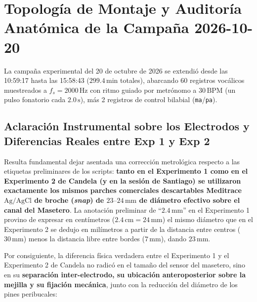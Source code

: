 \documentclass[11pt,a4paper]{article}
\begin{document}
\section{Topología de Montaje y Auditoría Anatómica de la Campaña 2026-10-20}

La campaña experimental del 20 de octubre de 2026 se extendió desde las 10:59:17 hasta las 15:58:43 ($299.4\,\text{min}$ totales), abarcando 60 registros vocálicos muestreados a $f_s = 2000\,\text{Hz}$ con ritmo guiado por metrónomo a $30\,\text{BPM}$ (un pulso fonatorio cada $2.0\,\text{s}$), más 2 registros de control bilabial (\texttt{ma}/\texttt{pa}).

\subsection{Aclaración Instrumental sobre los Electrodos y Diferencias Reales entre Exp 1 y Exp 2}
Resulta fundamental dejar asentada una corrección metrológica respecto a las etiquetas preliminares de los scripts: \textbf{tanto en el Experimento 1 como en el Experimento 2 de Candela (y en la sesión de Santiago) se utilizaron exactamente los mismos parches comerciales descartables Meditrace $\text{Ag/AgCl}$ de broche (\textit{snap}) de $23\text{--}24\,\text{mm}$ de diámetro efectivo sobre el canal del Masetero}. La anotación preliminar de ``$2.4\,\text{mm}$'' en el Experimento 1 provino de expresar en centímetros ($2.4\,\text{cm} = 24\,\text{mm}$) el mismo diámetro que en el Experimento 2 se dedujo en milímetros a partir de la distancia entre centros ($30\,\text{mm}$) menos la distancia libre entre bordes ($7\,\text{mm}$), dando $23\,\text{mm}$.

Por consiguiente, la diferencia física verdadera entre el Experimento 1 y el Experimento 2 de Candela no radicó en el tamaño del sensor del masetero, sino en su \textbf{separación inter-electrodo, su ubicación anteroposterior sobre la mejilla y su fijación mecánica}, junto con la reducción del diámetro de los pines peribucales:
\end{document}
